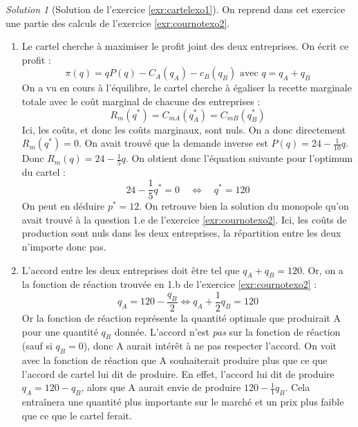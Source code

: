 \documentclass[
]{book}
\providecommand{\tightlist}{%
  \setlength{\itemsep}{0pt}\setlength{\parskip}{0pt}}
\theoremstyle{definition}
\theoremstyle{definition}
\theoremstyle{definition}
\theoremstyle{definition}
\theoremstyle{remark}
\newtheorem*{solution}{Solution}
\begin{document}
\begin{solution}[Solution de l'exercice \ref{exr:cartelexo1}]

On reprend dans cet exercice une partie des calculs de l'exercice \ref{exr:cournotexo2}.

\begin{enumerate}
\def\labelenumi{\arabic{enumi}.}
\tightlist
\item
  Le cartel cherche à maximiser le profit joint des deux entreprises.
  On écrit ce profit :
  \[\pi(q)=qP(q)-C_A(q_A)-c_B(q_B)\text{ avec }q=q_A+q_B\]
  On a vu en cours à l'équilibre, le cartel cherche à égaliser la recette marginale totale avec le coût marginal de chacune des entreprises :
  \[R_m(q^*)=C_{mA}(q_A^*)=C_{mB}(q_B^*)\]
  Ici, les coûts, et donc les coûts marginaux, sont nuls.
  On a donc directement \(R_m(q^*)=0\).
  On avait trouvé que la demande inverse est \(P(q)=24-\frac{1}{10}q\).
  Donc \(R_m(q)=24-\frac{1}{5}q\).
  On obtient donc l'équation suivante pour l'optimum du cartel :
  \[24-\frac{1}{5}q^*=0\quad\Leftrightarrow\quad q^*=120\]
  On peut en déduire \(p^*=12\).
  On retrouve bien la solution du monopole qu'on avait trouvé à la question 1.e de l'exercice \ref{exr:cournotexo2}.
  Ici, les coûts de production sont nuls dans les deux entreprises, la répartition entre les deux n'importe donc pas.
\item
  L'accord entre les deux entreprises doit être tel que \(q_A+q_B=120\).
  Or, on a la fonction de réaction trouvée en 1.b de l'exercice \ref{exr:cournotexo2} :
  \[q_A=120-\frac{q_B}{2}\Leftrightarrow q_A+\frac{1}{2}q_B=120\]
  Or la fonction de réaction représente la quantité optimale que produirait A pour une quantité \(q_B\) donnée.
  L'accord n'est \emph{pas} sur la fonction de réaction (sauf si \(q_B=0\)), donc A aurait intérêt à ne pas respecter l'accord.
  On voit avec la fonction de réaction que A souhaiterait produire plus que ce que l'accord de cartel lui dit de produire.
  En effet, l'accord lui dit de produire \(q_A=120-q_B\), alors que A aurait envie de produire \(120-\frac{1}{1}q_B\).
  Cela entraînera une quantité plus importante sur le marché et un prix plus faible que ce que le cartel ferait.
\end{enumerate}

\end{solution}
\end{document}
